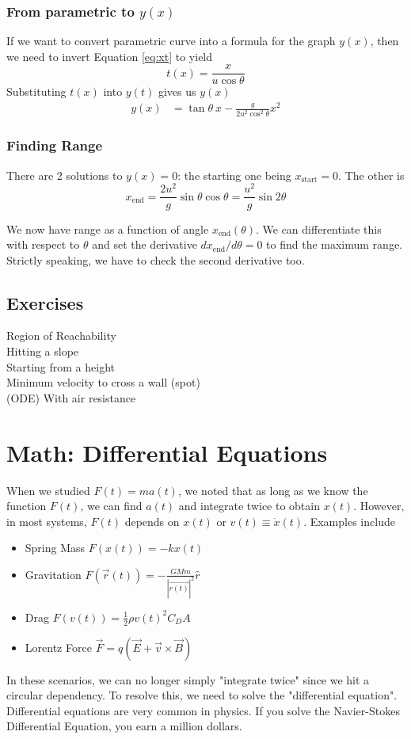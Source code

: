 \documentclass{article}
\begin{document}
\subsubsection{From parametric to $y(x)$}
If we want to convert parametric curve into a formula for the graph $y(x)$, then we need to invert Equation \ref{eq:xt} to yield $$t(x) = {\frac{x}{u \cos \theta}}$$
Substituting $t(x)$ into $y(t)$ gives us $y(x)$
\begin{align}
    y(x) &= \tan \theta\ x - \frac{g}{2u^2 \cos^2 \theta} x^2
\end{align}
\subsubsection{Finding Range}
There are 2 solutions to $y(x) = 0$: the starting one being $x_{\text{start}}=0$. The other is 
$$x_{\text{end}} = \frac{2u^2}{g} \sin \theta \cos \theta = \frac{u^2}{g} \sin 2\theta$$

We now have range as a function of angle $x_{\text{end}}(\theta)$. We can differentiate this with respect to $\theta$ and set the derivative $dx_{\text{end}}/d\theta = 0$ to find the maximum range. Strictly speaking, we have to check the second derivative too.
\subsection{Exercises}
Region of Reachability\\
Hitting a slope\\
Starting from a height \\
Minimum velocity to cross a wall (spot)\\
(ODE) With air resistance
\section{Math: Differential Equations}
When we studied $F(t)=ma(t)$, we noted that as long as we know the function $F(t)$, we can find $a(t)$ and integrate twice to obtain $x(t)$. However, in most systems, $F(t)$ depends on $x(t)$ or $v(t) \equiv \dot{x}(t)$. Examples include 
\begin{itemize}
    \item Spring Mass $F(x(t)) = -kx(t)$
    \item Gravitation $F(\vec{r}(t)) = -\frac{GMm}{|\vec{r(t)}|^2} \hat{r}$
    \item Drag $F(v(t)) = \frac{1}{2} \rho v(t)^2 C_D A$
    \item Lorentz Force $\vec{F} = q(\vec{E} + \vec{v} \times \vec{B})$
\end{itemize}
In these scenarios, we can no longer simply "integrate twice" since we hit a circular dependency. To resolve this, we need to solve the "differential equation". Differential equations are very common in physics. If you solve the Navier-Stokes Differential Equation, you earn a million dollars.
\end{document}
